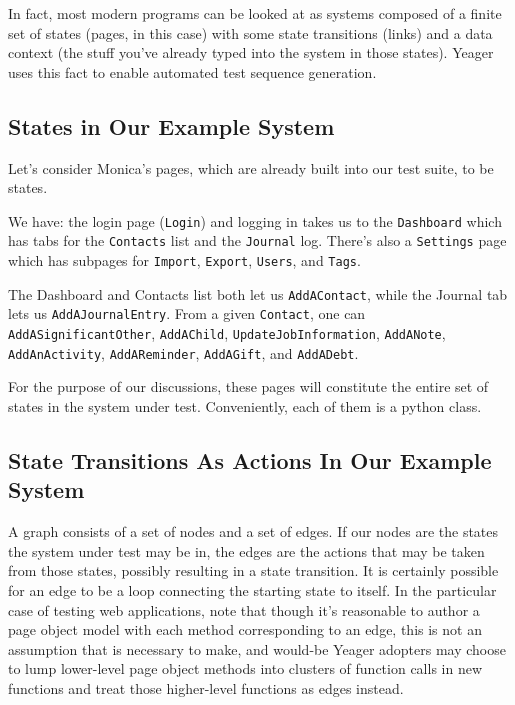 In fact, most modern programs can be looked at as systems composed of a finite set of states (pages, in this case) with some state transitions (links) and a data context (the stuff you've already typed into the system in those states). Yeager uses this fact to enable automated test sequence generation.

\subsection{States in Our Example System}
Let's consider Monica's pages, which are already built into our test suite, to be states.

We have: the login page (\texttt{Login}) and logging in takes us to the \texttt{Dashboard} which has tabs for the \texttt{Contacts} list and the \texttt{Journal} log. There's also a \texttt{Settings} page which has subpages for \texttt{Import}, \texttt{Export}, \texttt{Users}, and \texttt{Tags}.

The Dashboard and Contacts list both let us \texttt{AddAContact}, while the Journal tab lets us \texttt{AddAJournalEntry}. From a given \texttt{Contact}, one can \texttt{AddASignificantOther}, \texttt{AddAChild}, \texttt{UpdateJobInformation}, \texttt{AddANote}, \texttt{AddAnActivity}, \texttt{AddAReminder}, \texttt{AddAGift}, and \texttt{AddADebt}.

For the purpose of our discussions, these pages will constitute the entire set of states in the system under test. Conveniently, each of them is a python class.

\subsection{State Transitions As Actions In Our Example System}
A graph consists of a set of nodes and a set of edges. If our nodes are the states the system under test may be in, the edges are the actions that may be taken from those states, possibly resulting in a state transition. It is certainly possible for an edge to be a loop connecting the starting state to itself. In the particular case of testing web applications, note that though it's reasonable to author a page object model with each method corresponding to an edge, this is not an assumption that is necessary to make, and would-be Yeager adopters may choose to lump lower-level page object methods into clusters of function calls in new functions and treat those higher-level functions as edges instead.


